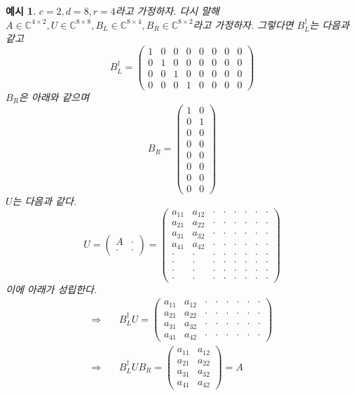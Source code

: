 \documentclass[hidelinks,article,a4paper,chapter,twocolumn]{oblivoir}
\newtheorem{exem}{예시}[chapter]
\begin{document}
\begin{exem}
$c=2,d=8,r=4$라고 가정하자. 다시 말해 $A\in\mathbb{C}^{4\times2},
U\in\mathbb{C}^{8\times 8}, B_{L}\in\mathbb{C}^{8\times 4}, 
B_{R}\in\mathbb{C}^{8\times 2}$라고 가정하자. 그렇다면 $B_L^{\dagger}$는
다음과 같고
\[
B^{\dagger}_{L} =
    \begin{pmatrix}
      1&0&0&0&0&0&0&0\\0&1&0&0&0&0&0&0\\0&0&1&0&0&0&0&0\\0&0&0&1&0&0&0&0
  \end{pmatrix}
\]
$B_R$은 아래와 같으며
\[
B_{R} =  \begin{pmatrix}
    1&0\\0&1\\0&0\\0&0\\0&0\\0&0\\0&0\\0&0
  \end{pmatrix}
\]
$U$는 다음과 같다. 
\[
U = \begin{pmatrix}A&\cdot\\\cdot&\cdot\end{pmatrix} =
  \begin{pmatrix}
    a_{11}&a_{12}&\cdot&\cdot&\cdot&\cdot&\cdot&\cdot\\
    a_{21}&a_{22}&\cdot&\cdot&\cdot&\cdot&\cdot&\cdot\\
    a_{31}&a_{32}&\cdot&\cdot&\cdot&\cdot&\cdot&\cdot\\
    a_{41}&a_{42}&\cdot&\cdot&\cdot&\cdot&\cdot&\cdot\\
    \cdot&\cdot&\cdot&\cdot&\cdot&\cdot&\cdot&\cdot\\
    \cdot&\cdot&\cdot&\cdot&\cdot&\cdot&\cdot&\cdot\\
    \cdot&\cdot&\cdot&\cdot&\cdot&\cdot&\cdot&\cdot\\
    \cdot&\cdot&\cdot&\cdot&\cdot&\cdot&\cdot&\cdot
  \end{pmatrix}
\]
이에 아래가 성립한다.
\begin{align*}
  \Rightarrow\quad &B_{L}^{\dagger}U = 
  \begin{pmatrix}
    a_{11}&a_{12}&\cdot&\cdot&\cdot&\cdot&\cdot&\cdot\\
    a_{21}&a_{22}&\cdot&\cdot&\cdot&\cdot&\cdot&\cdot\\
    a_{31}&a_{32}&\cdot&\cdot&\cdot&\cdot&\cdot&\cdot\\
    a_{41}&a_{42}&\cdot&\cdot&\cdot&\cdot&\cdot&\cdot
  \end{pmatrix}\\\Rightarrow\quad&
  B_{L}^{\dagger}UB_{R} =
  \begin{pmatrix}
    a_{11}&a_{12}\\a_{21}&a_{22}\\a_{31}&a_{32}\\a_{41}&a_{42}
  \end{pmatrix}
= A
\end{align*}
\end{exem}
\end{document}
